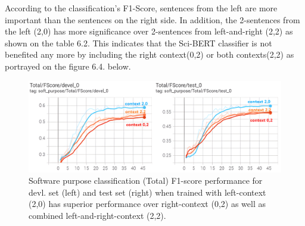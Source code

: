 According to the classification's F1-Score, sentences from the left are more important than the sentences on the right side. In addition, the 2-sentences from the left (2,0) has more significance over 2-sentences from left-and-right (2,2) as shown on the table 6.2. This indicates that the Sci-BERT classifier is not benefited any more by including the right context(0,2) or both contexts(2,2) as portrayed on the figure 6.4. below. 

\begin{figure}[htbp]
	\centering
	\includegraphics[width=.86\textwidth]{4.graphics/figures/ch_6/2.left_context_vs_right/HD/left_both_right_hd}
	\caption{Software purpose classification (Total) F1-score performance for devl. set (left) and test set (right) when trained with left-context (2,0) has superior performance over right-context (0,2) as well as combined left-and-right-context (2,2).}
	\label{fig:chapter06:l-r-softwarepurpose}
\end{figure}

